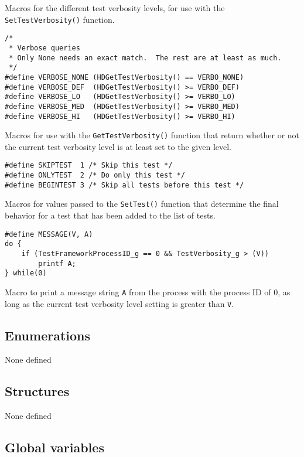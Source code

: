 \documentclass[../HDF5_RFC.tex]{subfiles}
\begin{document}
Macros for the different test verbosity levels, for use with the \texttt{SetTestVerbosity()} function.

\begin{verbatim}
/*
 * Verbose queries
 * Only None needs an exact match.  The rest are at least as much.
 */
#define VERBOSE_NONE (HDGetTestVerbosity() == VERBO_NONE)
#define VERBOSE_DEF  (HDGetTestVerbosity() >= VERBO_DEF)
#define VERBOSE_LO   (HDGetTestVerbosity() >= VERBO_LO)
#define VERBOSE_MED  (HDGetTestVerbosity() >= VERBO_MED)
#define VERBOSE_HI   (HDGetTestVerbosity() >= VERBO_HI)
\end{verbatim}

Macros for use with the \texttt{GetTestVerbosity()} function that return whether or not the current
test verbosity level is at least set to the given level.

\begin{verbatim}
#define SKIPTEST  1 /* Skip this test */
#define ONLYTEST  2 /* Do only this test */
#define BEGINTEST 3 /* Skip all tests before this test */
\end{verbatim}

Macros for values passed to the \texttt{SetTest()} function that determine the final behavior for a
test that has been added to the list of tests.

\begin{verbatim}
#define MESSAGE(V, A)
do {
    if (TestFrameworkProcessID_g == 0 && TestVerbosity_g > (V))
        printf A;
} while(0)
\end{verbatim}

Macro to print a message string \texttt{A} from the process with the process ID of 0, as long as the current test verbosity level setting is greater than \texttt{V}.

\subsection{Enumerations}

None defined

\subsection{Structures}

None defined

\subsection{Global variables}
\end{document}
